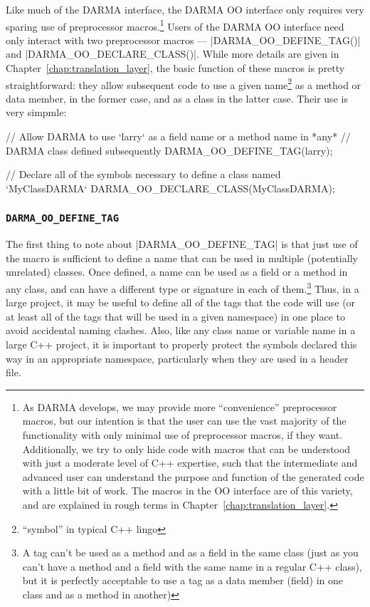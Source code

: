 Like much of the DARMA interface, the DARMA OO interface only requires very
sparing use of preprocessor macros.\footnote{As DARMA develops, we may provide
more ``convenience'' preprocessor macros, but our intention is that the user
can use the vast majority of the functionality with only minimal use of
preprocessor macros, if they want.  Additionally, we try to only hide code with
macros that can be understood with just a moderate level of C++ expertise, such
that the intermediate and advanced user can understand the purpose and function
of the generated code with a little bit of work.  The macros in the OO
interface are of this variety, and are explained in rough terms in
Chapter~\ref{chap:translation_layer}.}  Users of the DARMA OO interface need
only interact with two preprocessor macros --- |DARMA_OO_DEFINE_TAG()| and
|DARMA_OO_DECLARE_CLASS()|.  While more details are given in
Chapter~\ref{chap:translation_layer}, the basic function of these macros is
pretty straightforward:  they allow subsequent code to use a given
name\footnote{``symbol'' in typical C++ lingo} as a method or data member, in
the former case, and as a class in the latter case.  Their use is very
simpmle:
\begin{CppCodeNumb}
// Allow DARMA to use `larry` as a field name or a method name in *any*
// DARMA class defined subsequently
DARMA_OO_DEFINE_TAG(larry);

// Declare all of the symbols necessary to define a class named `MyClassDARMA`
DARMA_OO_DECLARE_CLASS(MyClassDARMA);
\end{CppCodeNumb}

\subsubsection{\texttt{DARMA\_OO\_DEFINE\_TAG}}

The first thing to note about |DARMA_OO_DEFINE_TAG| is that just use of the
macro is sufficient to define a name that can be used in multiple (potentially
unrelated) classes.  Once defined, a name can be used as a field or a method in
any class, and can have a different type or signature in each of
them.\footnote{A tag can't be used as a method and as a field in the same class
(just as you can't have a method and a field with the same name in a regular
C++ class), but it is perfectly acceptable to use a tag as a data member
(field) in one class and as a method in another)} Thus, in a large project, it
may be useful to define all of the tags that the code will use (or at least all
of the tags that will be used in a given namespace) in one place to avoid
accidental naming clashes.  Also, like any class name or variable name in a
large C++ project, it is important to properly protect the symbols declared this
way in an appropriate namespace, particularly when they are used in a header file.


